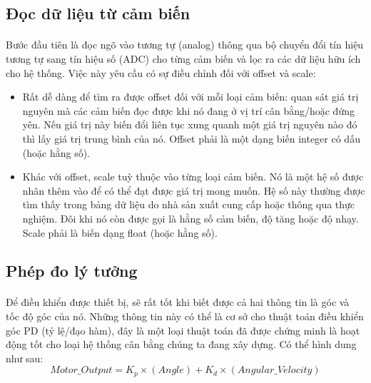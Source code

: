 \subsection{Đọc dữ liệu từ cảm biến}
\paragraph{}Bước đầu tiên là đọc ngõ vào tương tự (analog) thông qua bộ chuyển đổi tín hiệu tương tự sang tín hiệu số (ADC) cho từng cảm biến và lọc ra các dữ liệu hữu ích cho hệ thống. Việc này yêu cầu có sự điều chỉnh đối với offset và scale:
\begin{itemize}
	\item Rất dễ dàng để tìm ra được offset đối với mỗi loại cảm biến: quan sát giá trị nguyên mà các cảm biến đọc được khi nó đang ở vị trí cân bằng/hoặc đứng yên. Nếu giá trị này biến đổi liên tục xung quanh một giá trị nguyên nào đó thì lấy giá trị trung bình của nó. Offset phải là một dạng biến integer có dấu (hoặc hằng số). 
	\item Khác với offset, scale tuỳ thuộc vào từng loại cảm biến. Nó là một hệ số được nhân thêm vào để có thể đạt được giá trị mong muốn. Hệ số này thường được tìm thấy trong bảng dữ liệu do nhà sản xuất cung cấp hoặc thông qua thực nghiệm. Đôi khi nó còn được gọi là hằng số cảm biến, độ tăng hoặc độ nhạy. Scale phải là biến dạng float (hoặc hằng số).
\end{itemize}
\subsection{Phép đo lý tưởng}
\paragraph{}Để điều khiển được thiết bị, sẽ rất tốt khi biết được cả hai thông tin là góc và tốc độ góc của nó. Những thông tin này có thể là cơ sở cho thuật toán điều khiển góc PD (tỷ lệ/đạo hàm), đây là một loại thuật toán đã được chứng minh là hoạt động tốt cho loại hệ thống cân bằng chúng ta đang xây dựng. Có thể hình dung như sau:
\begin{equation}
Motor\_Output = K_{p} \times (Angle) + K_{d} \times (Angular\_Velocity) 
\end{equation}
